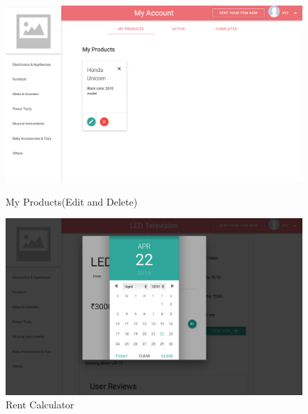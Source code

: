 \documentclass[11pt]{report}
\begin{document}
    \begin{figure}[h]
  \centering
    \includegraphics[width=6in]{myprod.png} 
	\caption{My Products(Edit and Delete)}
\vspace{0.5in}
  \centering
    \includegraphics[width=6in]{rentcalc.png} 
	\caption{Rent Calculator}
	\end{figure}
\end{document}
